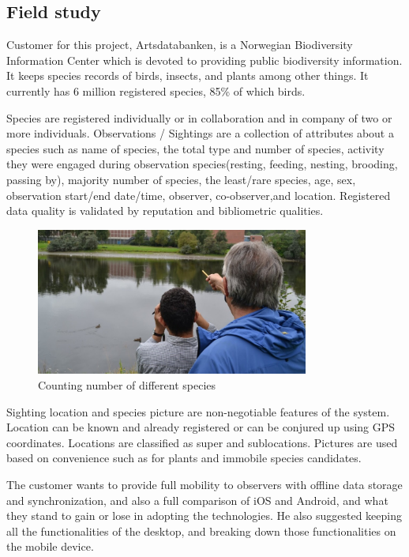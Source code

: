 \subsection{Field study}

Customer for this project, Artsdatabanken, is a Norwegian  Biodiversity Information Center which is devoted to providing public biodiversity information. It keeps species records of birds, insects, and plants among other things. It currently has 6 million registered species, 85\% of which birds. \newline

Species are registered individually or in collaboration and in company of two or more individuals. Observations / Sightings are a collection of attributes about a species such as name of species, the total type and number of species, activity they were engaged during observation species(resting, feeding, nesting, brooding, passing by), majority number of species, the least/rare species, age, sex, observation start/end date/time, observer, co-observer,and location. Registered data quality is validated by reputation and bibliometric qualities.\newline

\begin{figure}[htb]
	\centering
	\includegraphics[width=0.8\textwidth]{prestudy/field_study/field_stud.jpg}
	\caption{Counting number of different species}
	\label{fig:field_study}
\end{figure}

Sighting location and species picture are non-negotiable features of the system. Location can be known and already registered or can be conjured up using GPS coordinates. Locations are classified as super and sublocations. Pictures are used based on convenience such as for plants and immobile species candidates.\newline

The customer wants to provide full mobility to observers with offline data storage  and synchronization, and also a full comparison of iOS and Android, and what they stand to gain or lose in adopting the technologies. He also suggested keeping all the functionalities of the desktop, and breaking down those functionalities on the mobile device.\newline

